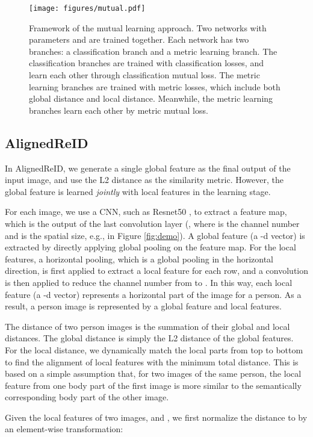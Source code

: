 \documentclass[10pt,twocolumn,letterpaper]{article}
\begin{document}
\begin{figure*}[t]
\centering
\texttt{[image: figures/mutual.pdf]}
\caption{Framework of the mutual learning approach. Two networks with parameters  and  are trained together. Each network has two branches: a classification branch and a metric learning branch. The classification branches are trained with classification losses, and learn each other through classification mutual loss. The metric learning branches are trained with metric losses, which include both global distance and local distance. Meanwhile, the metric learning branches learn each other by metric mutual loss.}
\label{fig:mutual}
\end{figure*}

\subsection{AlignedReID}
In AlignedReID, we generate a single global feature as the final output of the input image, and use the L2 distance as the similarity metric. However, the global feature is learned \emph{jointly} with local features in the learning stage. 

For each image, we use a CNN, such as Resnet50 \cite{he2016deep}, to extract a feature map, which is the output of the last convolution layer (, where  is the channel number and  is the spatial size, e.g.,  in Figure \ref{fig:demo}).
A global feature (a -d vector) is extracted by directly applying global pooling on the feature map.
For the local features, a horizontal pooling, which is a global pooling in the horizontal direction, is first applied to extract a local feature for each row, and a  convolution is then applied to reduce the channel number from  to .
In this way, each local feature (a -d vector) represents a horizontal part of the image for a person.
As a result, a person image is represented by a global feature and  local features.

The distance of two person images is the summation of their global and local distances.
The global distance is simply the L2 distance of the global features.
For the local distance, we dynamically match the local parts from top to bottom to find the alignment of local features with the minimum total distance.
This is based on a simple assumption that, for two images of the same person, the local feature from one body part of the first image is more similar to the semantically corresponding body part of the other image.

Given the local features of two images,  and , we first normalize the distance to  by an element-wise transformation:
 
\end{document}
